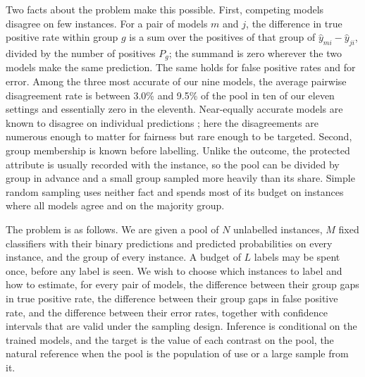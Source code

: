 Two facts about the problem make this possible. First, competing models disagree on few instances. For a pair of models $m$ and $j$, the difference in true positive rate within group $g$ is a sum over the positives of that group of $\hat y_{mi}-\hat y_{ji}$, divided by the number of positives $P_g$; the summand is zero wherever the two models make the same prediction. The same holds for false positive rates and for error. Among the three most accurate of our nine models, the average pairwise disagreement rate is between 3.0\% and 9.5\% of the pool in ten of our eleven settings and essentially zero in the eleventh. Near-equally accurate models are known to disagree on individual predictions \citep{marx2020}; here the disagreements are numerous enough to matter for fairness but rare enough to be targeted. Second, group membership is known before labelling. Unlike the outcome, the protected attribute is usually recorded with the instance, so the pool can be divided by group in advance and a small group sampled more heavily than its share. Simple random sampling uses neither fact and spends most of its budget on instances where all models agree and on the majority group.

The problem is as follows. We are given a pool of $N$ unlabelled instances, $M$ fixed classifiers with their binary predictions and predicted probabilities on every instance, and the group of every instance. A budget of $L$ labels may be spent once, before any label is seen. We wish to choose which instances to label and how to estimate, for every pair of models, the difference between their group gaps in true positive rate, the difference between their group gaps in false positive rate, and the difference between their error rates, together with confidence intervals that are valid under the sampling design. Inference is conditional on the trained models, and the target is the value of each contrast on the pool, the natural reference when the pool is the population of use or a large sample from it.

